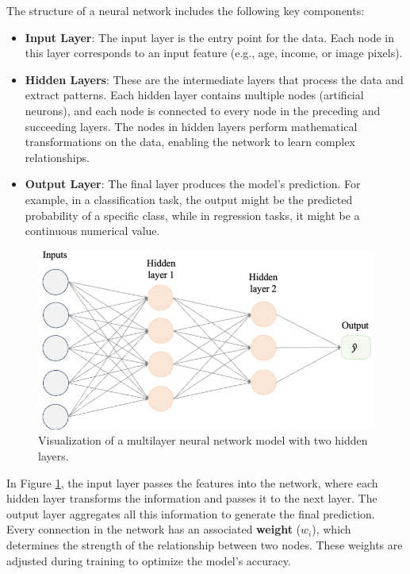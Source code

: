 \documentclass[
]{book}
\providecommand{\tightlist}{%
  \setlength{\itemsep}{0pt}\setlength{\parskip}{0pt}}
\theoremstyle{definition}
\theoremstyle{definition}
\theoremstyle{definition}
\theoremstyle{definition}
\theoremstyle{remark}
\begin{document}
The structure of a neural network includes the following key components:

\begin{itemize}
\tightlist
\item
  \textbf{Input Layer}: The input layer is the entry point for the data. Each node in this layer corresponds to an input feature (e.g., age, income, or image pixels).\\
\item
  \textbf{Hidden Layers}: These are the intermediate layers that process the data and extract patterns. Each hidden layer contains multiple nodes (artificial neurons), and each node is connected to every node in the preceding and succeeding layers. The nodes in hidden layers perform mathematical transformations on the data, enabling the network to learn complex relationships.\\
\item
  \textbf{Output Layer}: The final layer produces the model's prediction. For example, in a classification task, the output might be the predicted probability of a specific class, while in regression tasks, it might be a continuous numerical value.
\end{itemize}

\begin{figure}

{\centering \includegraphics[width=0.8\linewidth]{images/net_large} 

}

\caption{Visualization of a multilayer neural network model with two hidden layers.}\label{fig:net-large}
\end{figure}

In Figure \ref{fig:net-large}, the input layer passes the features into the network, where each hidden layer transforms the information and passes it to the next layer. The output layer aggregates all this information to generate the final prediction. Every connection in the network has an associated \textbf{weight} (\(w_i\)), which determines the strength of the relationship between two nodes. These weights are adjusted during training to optimize the model's accuracy.
\end{document}
